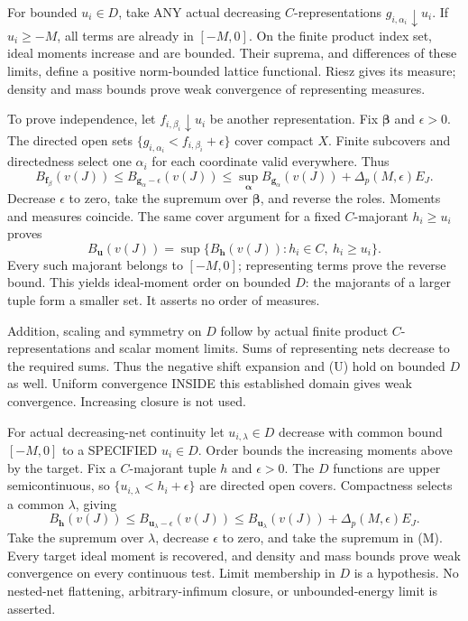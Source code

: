 For bounded \(u_i\in D\), take ANY actual decreasing \(C\)-representations \(g_{i,\alpha_i}\downarrow u_i\). If \(u_i\ge-M\), all terms are already in \([-M,0]\). On the finite product index set, ideal moments increase and are bounded. Their suprema, and differences of these limits, define a positive norm-bounded lattice functional. Riesz gives its measure; density and mass bounds prove weak convergence of representing measures.

To prove independence, let \(f_{i,\beta_i}\downarrow u_i\) be another representation. Fix \(\boldsymbol\beta\) and \(\epsilon>0\). The directed open sets \(\{g_{i,\alpha_i}<f_{i,\beta_i}+\epsilon\}\) cover compact \(X\). Finite subcovers and directedness select one \(\alpha_i\) for each coordinate valid everywhere. Thus
\[
B_{\boldsymbol f_\beta}(v(J))
\le B_{\boldsymbol g_\alpha-\epsilon}(v(J))
\le\sup_{\boldsymbol\alpha}B_{\boldsymbol g_\alpha}(v(J))+\Delta_p(M,\epsilon)E_J.
\]
Decrease \(\epsilon\) to zero, take the supremum over \(\boldsymbol\beta\), and reverse the roles. Moments and measures coincide. The same cover argument for a fixed \(C\)-majorant \(h_i\ge u_i\) proves
\[
B_{\boldsymbol u}(v(J))
=\sup\{B_{\boldsymbol h}(v(J)):h_i\in C,\ h_i\ge u_i\}. \tag{M}
\]
Every such majorant belongs to \([-M,0]\); representing terms prove the reverse bound. This yields ideal-moment order on bounded \(D\): the majorants of a larger tuple form a smaller set. It asserts no order of measures.

Addition, scaling and symmetry on \(D\) follow by actual finite product \(C\)-representations and scalar moment limits. Sums of representing nets decrease to the required sums. Thus the negative shift expansion and (U) hold on bounded \(D\) as well. Uniform convergence INSIDE this established domain gives weak convergence. Increasing closure is not used.

For actual decreasing-net continuity let \(u_{i,\lambda}\in D\) decrease with common bound \([-M,0]\) to a SPECIFIED \(u_i\in D\). Order bounds the increasing moments above by the target. Fix a \(C\)-majorant tuple \(h\) and \(\epsilon>0\). The \(D\) functions are upper semicontinuous, so \(\{u_{i,\lambda}<h_i+\epsilon\}\) are directed open covers. Compactness selects a common \(\lambda\), giving
\[
B_{\boldsymbol h}(v(J))\le B_{\boldsymbol u_\lambda-\epsilon}(v(J))
\le B_{\boldsymbol u_\lambda}(v(J))+\Delta_p(M,\epsilon)E_J.
\]
Take the supremum over \(\lambda\), decrease \(\epsilon\) to zero, and take the supremum in (M). Every target ideal moment is recovered, and density and mass bounds prove weak convergence on every continuous test. Limit membership in \(D\) is a hypothesis. No nested-net flattening, arbitrary-infimum closure, or unbounded-energy limit is asserted.
